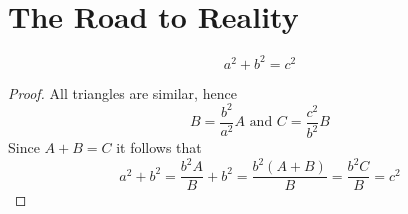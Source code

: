 
\newpage
\section{The Road to Reality}
\begin{theorem}[Pythagoras]\label{thm:thm_pythagoras}

    \[
    a^2 + b^2 = c^2
\]
\end{theorem}


\begin{proof}
All triangles are similar, hence
\[
    B = \frac{b^2}{a^2} A \text{ and }  C =  \frac{c^2}{b^2} B 
\]
Since \( A + B = C \) it follows that
\[
     a^2 + b^2 = \frac{b^2A}{B} + b^2 = \frac{b^2(A + B)}{B} = \frac{b^2 C}{B} = c^2
\]
\end{proof}
\bigskip
